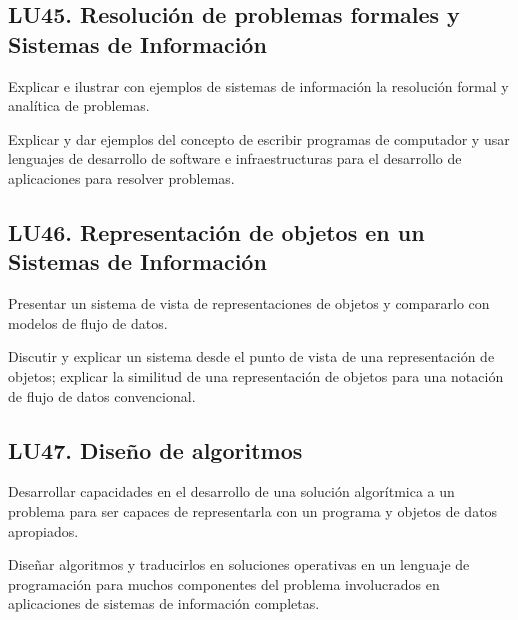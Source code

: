 \subsection{LU45. Resolución de problemas formales y Sistemas de Información}\label{sec:LU45}
\begin{LearningUnit}
\begin{LUGoal}
\item Explicar e ilustrar con ejemplos de sistemas de información la resolución formal y analítica de problemas.
\end{LUGoal}

\begin{LUObjective}
\item Explicar y dar ejemplos del concepto de escribir programas de computador y usar lenguajes de desarrollo de software e infraestructuras para el desarrollo de aplicaciones para resolver problemas.
\end{LUObjective}
\end{LearningUnit}

\subsection{LU46. Representación de objetos en un Sistemas de Información}\label{sec:LU46}
\begin{LearningUnit}
\begin{LUGoal}
\item Presentar un sistema de vista de representaciones de objetos y compararlo con modelos de flujo de datos.
\end{LUGoal}

\begin{LUObjective}
\item Discutir y explicar un sistema desde el punto de vista de una representación de objetos; explicar la similitud de una representación de objetos para una notación de flujo de datos convencional.
\end{LUObjective}
\end{LearningUnit}

\subsection{LU47. Diseño de algoritmos}\label{sec:LU47}
\begin{LearningUnit}
\begin{LUGoal}
\item Desarrollar capacidades en el desarrollo de una solución algorítmica a un problema para ser capaces de representarla con un programa y objetos de datos apropiados.
\end{LUGoal}

\begin{LUObjective}
\item Diseñar algoritmos y traducirlos en soluciones operativas en un lenguaje de programación para muchos componentes del problema involucrados en aplicaciones de sistemas de información completas.
\end{LUObjective}
\end{LearningUnit}

